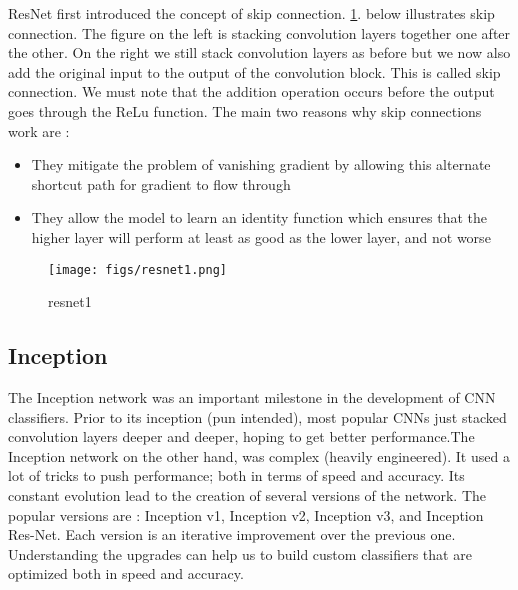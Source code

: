 ResNet first introduced the concept of skip connection. \cref{fig:resnet1}. below illustrates skip connection. The figure on the left is stacking convolution layers together one after the other. On the right we still stack convolution layers as before but we now also add the original input to the output of the convolution block. This is called skip connection. We must note that the addition operation occurs before the output goes through the ReLu function.
The main two reasons why skip connections work are :

\begin{itemize}
  \item They mitigate the problem of vanishing gradient by allowing this alternate shortcut path for gradient to flow through
  \item They allow the model to learn an identity function which ensures that the higher layer will perform at least as good as the lower layer, and not worse
\end{itemize}

\begin{figure}[!htpb]
	\centering
	\texttt{[image: figs/resnet1.png]}
	\caption{resnet1}\label{fig:resnet1}
\end{figure}

\subsection{Inception}

The Inception network was an important milestone in the development of CNN classifiers. Prior to its inception (pun intended), most popular CNNs just stacked convolution layers deeper and deeper, hoping to get better performance.The Inception network on the other hand, was complex (heavily engineered). It used a lot of tricks to push performance; both in terms of speed and accuracy. Its constant evolution lead to the creation of several versions of the network. The popular versions are : Inception v1, Inception v2, Inception v3, and Inception Res-Net. Each version is an iterative improvement over the previous one. Understanding the upgrades can help us to build custom classifiers that are optimized both in speed and accuracy.

